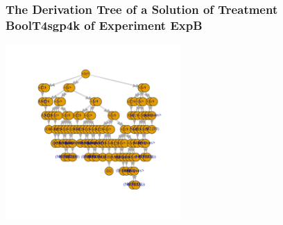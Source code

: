  \begin{frame}
 \frametitle{ The Derivation Tree of a Solution of Treatment BoolT4sgp4k of Experiment ExpB }
 \begin{center}
\includegraphics[width=0.5\textwidth, angle=0]
{ExpBDerivationTreeFigure022.pdf}
 \end{center}
 \label{report/ExpBDerivationTreeFigure022.pdf}  
 \end{frame}

